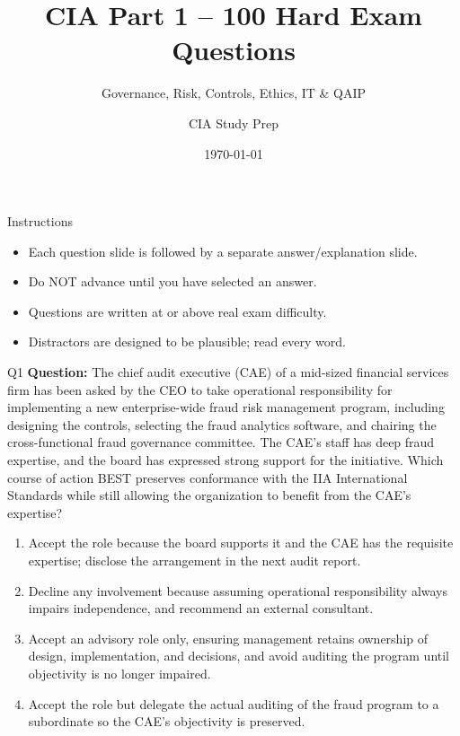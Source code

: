 \documentclass[aspectratio=169,10pt]{beamer}
\title{CIA Part 1 -- 100 Hard Exam Questions}
\subtitle{Governance, Risk, Controls, Ethics, IT \& QAIP}
\author{CIA Study Prep}
\date{\today}
\begin{document}
	
	\begin{frame}
		\titlepage
	\end{frame}
	
	\begin{frame}{Instructions}
		\begin{itemize}
			\item Each question slide is followed by a separate answer/explanation slide.
			\item Do NOT advance until you have selected an answer.
			\item Questions are written at or above real exam difficulty.
			\item Distractors are designed to be plausible; read every word.
		\end{itemize}
	\end{frame}
	
	\begin{frame}[t]{Q1}
		\small
		\textbf{Question:} The chief audit executive (CAE) of a mid-sized financial services firm has been asked by the CEO to take operational responsibility for implementing a new enterprise-wide fraud risk management program, including designing the controls, selecting the fraud analytics software, and chairing the cross-functional fraud governance committee. The CAE's staff has deep fraud expertise, and the board has expressed strong support for the initiative. Which course of action BEST preserves conformance with the IIA International Standards while still allowing the organization to benefit from the CAE's expertise?
		\begin{enumerate}[label=\Alph*.,itemsep=1pt,topsep=2pt]
			\item Accept the role because the board supports it and the CAE has the requisite expertise; disclose the arrangement in the next audit report.
			\item Decline any involvement because assuming operational responsibility always impairs independence, and recommend an external consultant.
			\item Accept an advisory role only, ensuring management retains ownership of design, implementation, and decisions, and avoid auditing the program until objectivity is no longer impaired.
			\item Accept the role but delegate the actual auditing of the fraud program to a subordinate so the CAE's objectivity is preserved.
		\end{enumerate}
	\end{frame}
	
\end{document}
